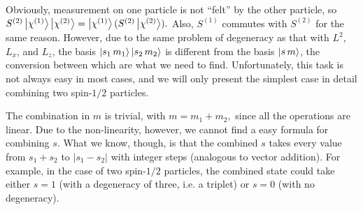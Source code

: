 \documentclass{article}
\theoremstyle{nonumberplain}
\begin{document}
Obviously, measurement on one particle is not ``felt'' by the other particle, so $ S^{(2)} \ket{\chi^{(1)}} \ket{\chi^{(2)}} =  \ket{\chi^{(1)}} (S^{(2)} \ket{\chi^{(2)}}).$ Also, $S^{(1)}$ commutes with $S^{(2)}$ for the same reason. However, due to the same problem of degeneracy as that with $L^2$, $L_x$, and $L_z$, the basis $\ket{s_1 \, m_1} \ket{s_2 \, m_2}$ is different from the basis $\ket{s \, m}$, the conversion between which are what we need to find. Unfortunately, this task is not always easy in most cases, and we will only present the simplest case in detail \textemdash combining two spin-$1 /2$ particles. 

The combination in $m$ is trivial, with $m = m_1 + m_2,$ since all the operations are linear. Due to the non-linearity, however, we cannot find a easy formula for combining $s$. What we know, though, is that the combined $s$ takes every value from $s_1 + s_2$ to $\left\vert s_1 - s_2 \right\vert $ with integer steps (analogous to vector addition). For example, in the case of two spin-$1/2$ particles, the combined state could take either $s=1$ (with a degeneracy of three, i.e. a triplet) or $s = 0$ (with no degeneracy). 
\end{document}
